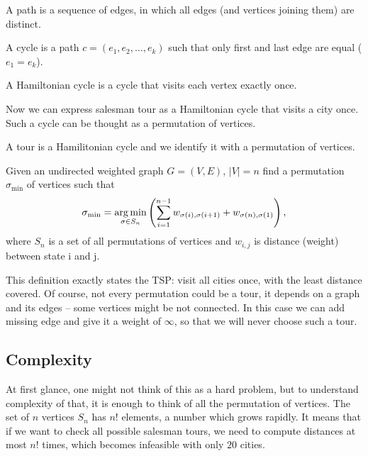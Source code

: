 	\begin{definition}
		A path is a sequence of edges, in which all edges (and vertices joining them) are distinct.
	\end{definition}
	\begin{definition}
		A cycle is a path $c = (e_1, e_2, \ldots, e_k)$ such that only first and last edge are equal ($e_1 = e_k$).
	\end{definition}
	\begin{definition}
		A Hamiltonian cycle is a cycle that visits each vertex exactly once.
	\end{definition}
	Now we can express salesman tour as a Hamiltonian cycle that visits a city once. Such a cycle can be thought as a permutation of vertices.
	\begin{definition}
		A tour is a Hamilitonian cycle and we identify it with a permutation of vertices.
	\end{definition}
	
	\begin{definition}
		Given an undirected weighted graph $G = (V, E)$, $|V| = n$ find a permutation $\sigma_{\min}$ of vertices such that
		\begin{equation*}
			\sigma_{\min} = \underset{\sigma \in S_n}{\operatorname*{arg\,min}} \left( \sum_{i=1}^{n-1} w_{\sigma(i), \sigma(i+1)} + w_{\sigma(n), \sigma(1)} \right),
		\end{equation*}
		where $S_n$ is a set of all permutations of vertices and $w_{i,j}$ is distance (weight) between state i and j.
	\end{definition}
	This definition exactly states the TSP: visit all cities once, with the least distance covered. Of course, not every permutation could be a tour, it depends on a graph and its edges -- some vertices might be not connected. In this case we can add missing edge and give it a weight of $\infty$, so that we will never choose such a tour.
	
\subsection{Complexity}
	At first glance, one might not think of this as a hard problem, but to understand complexity of that, it is enough to think of all the permutation of vertices. The set of $n$ vertices $S_n$ has $n!$ elements, a number which grows rapidly. It means that if we want to check all possible salesman tours, we need to compute distances at most $n!$ times, which becomes infeasible with only $20$ cities. 
	
